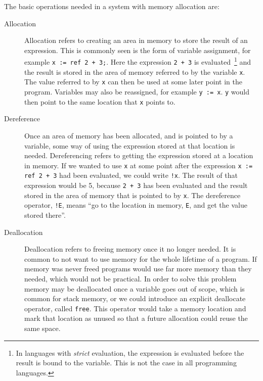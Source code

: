 The basic operations needed in a system with memory allocation are:
\begin{description}
    \item[Allocation]
        Allocation refers to creating an area in memory to store the result of
        an expression. This is commonly seen is the form of variable
        assignment, for example \lstinline{x := ref 2 + 3;}. Here the
        expression \lstinline{2 + 3} is evaluated~\footnote{In languages with
        \textit{strict} evaluation, the expression is evaluated before the
        result is bound to the variable. This is not the case in all
        programming languages.} and the result is stored in the area of memory
        referred to by the variable \lstinline{x}. The value referred to by
        \lstinline{x} can then be used at some later point in the program.
        Variables may also be reassigned, for example \lstinline{y := x}.
        \lstinline{y} would then point to the same location that \lstinline{x}
        points to.
    \item[Dereference]
        Once an area of memory has been allocated, and is pointed to by a
        variable, some way of using the expression stored at that location is
        needed. Dereferencing refers to getting the expression stored at a
        location in memory. If we wanted to use \lstinline{x} at some point
        after the expression \lstinline{x := ref 2 + 3} had been evaluated, we
        could write \lstinline{!x}. The result of that expression would be 5,
        because \lstinline{2 + 3} has been evaluated and the result stored in
        the area of memory that is pointed to by \lstinline{x}. The dereference
        operator, \lstinline{!E}, means ``go to the location in memory,
        \lstinline{E}, and get the value stored there''. 
    \item[Deallocation]
        Deallocation refers to freeing memory once it no longer needed. It is
        common to not want to use memory for the whole lifetime of a program.
        If memory was never freed programs would use far more memory than they
        needed, which would not be practical. In order to solve this problem
        memory may be deallocated once a variable goes out of scope, which is
        common for stack memory, or we could introduce an explicit deallocate
        operator, called \lstinline{free}. This operator would take a memory
        location and mark that location as unused so that a future allocation
        could reuse the same space.
\end{description}


